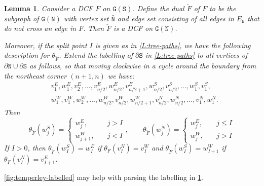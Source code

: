 \documentclass[11pt,twoside]{amsart}
\theoremstyle{plain}
\newtheorem{lem}[thm]{Lemma}
\numberwithin{quest}{section}
\theoremstyle{remark}
\numberwithin{rem}{section}
\theoremstyle{definition}
\renewcommand{\tt}[1]{{\mathtt{#1}}}
\begin{document}
	\begin{lem}
		\label{L:dimer-compatible-duals}
		Consider a DCF $F$ on $\tt{G}(\tt{S})$. Define the dual $\check F$ of $F$ to be the subgraph of $\tt{G}(\tt{N})$ with vertex set $\tt{\bar N}$ and edge set consisting of all edges in $E_\tt{N}$ that do not cross an edge in $F$. Then $\check F$ is a DCF on $\tt{G}(\tt{N})$. 
		
		Moreover, if the split point $I$ is given as in \cref{L:tree-paths}, we have the following description for $\theta_{\check F}$. Extend the labelling of $\partial \tt{S}$ in \cref{L:tree-paths} to all vertices of $\partial \tt{N} \cup \partial \tt{S}$ as follows, so that moving clockwise in a cycle around the boundary from the northeast corner $(n+1, n)$ we have:
		\begin{align*}
			&v_1^E, w_1^E, v_2^E, \dots, v^E_{n/2}, w_{n/2}^E, v_{n/2+1}^E, w^S_{n/2}, v^S_{n/2}, \dots, w^S_1, v^S_1, \\ &w^W_1, v^W_1,  w^W_2, \dots, w^W_{n/2}, v^W_{n/2}, w^W_{n/2 + 1}, v^N_{n/2}, w^N_{n/2}, \dots, v^N_{1}, w^N_{1}. 
		\end{align*}
		Then 
		$$
		\theta_{\check F}(w_j^S) = \begin{cases}
			w_j^E, \quad &j > I \\
			w_{j+1}^W, \quad &j < I 
		\end{cases}, \qquad \theta_{\check F}(w_j^N) = \begin{cases}
			w_j^E, \quad &j \le I \\
			w_j^W, \quad &j > I 
		\end{cases}
		$$
		If $I > 0$, then $\theta_{\check F}(w^S_I) = w_I^E$ if $\theta_F(v^N_I) = v^W_I$ and $\theta_{\check F}(w^S_I) = w_{I+1}^W$ if $\theta_F(v^N_I) = v^E_{I+1}$.
	\end{lem}
	
	\cref{fig:temperley-labelled} may help with parsing the labelling in \cref{L:dimer-compatible-duals}.
	
\end{document}
